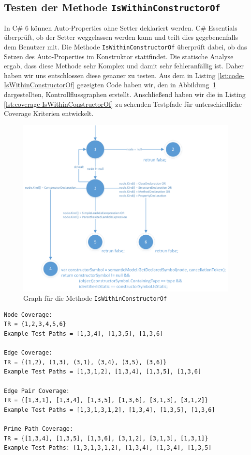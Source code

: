 \subsection{Testen der Methode \texttt{IsWithinConstructorOf}}
In C\# 6 können Auto-Properties ohne Setter deklariert werden.\cite{csharp6} C\# Essentials überprüft, ob der Setter weggelassen werden kann und teilt dies gegebenenfalls dem Benutzer mit. Die Methode \texttt{IsWithinConstructorOf} überprüft dabei, ob das Setzen des Auto-Properties im Konstruktor stattfindet. Die statische Analyse ergab, dass diese Methode sehr Komplex und damit sehr fehleranfällig ist. Daher haben wir uns entschlossen diese genauer zu testen. Aus dem in Listing \ref{lst:code-IsWithinConstructorOf} gezeigten Code haben wir, den in Abbildung~\ref{fig:graph-constructor} dargestellten, Kontrollflussgraphen erstellt. Anschließend haben wir die in Listing \ref{lst:coverage-IsWithinConstructorOf} zu sehenden Testpfade für unterschiedliche Coverage Kriterien entwickelt.\\
\begin{figure}[h]
	\centering
	\includegraphics[width=\textwidth]{images/GraphIsWithinConstructorOf.png}
	\caption{Graph für die Methode \texttt{IsWithinConstructorOf}}
	\label{fig:graph-constructor}
\end{figure}
\begin{lstlisting}[caption={Coverage für die Mehtode \texttt{IsWithinConstructorOf}},
label=lst:coverage-IsWithinConstructorOf]
Node Coverage:
TR = {1,2,3,4,5,6}
Example Test Paths = [1,3,4], [1,3,5], [1,3,6]

Edge Coverage:
TR = {(1,2), (1,3), (3,1), (3,4), (3,5), (3,6)}
Example Test Paths = [1,3,1,2], [1,3,4], [1,3,5], [1,3,6]

Edge Pair Coverage:
TR = {[1,3,1], [1,3,4], [1,3,5], [1,3,6], [3,1,3], [3,1,2]}
Example Test Paths = [1,3,1,3,1,2], [1,3,4], [1,3,5], [1,3,6]

Prime Path Coverage:
TR = {[1,3,4], [1,3,5], [1,3,6], [3,1,2], [3,1,3], [1,3,1]}
Example Test Paths: [1,3,1,3,1,2], [1,3,4], [1,3,4], [1,3,5]
\end{lstlisting}
